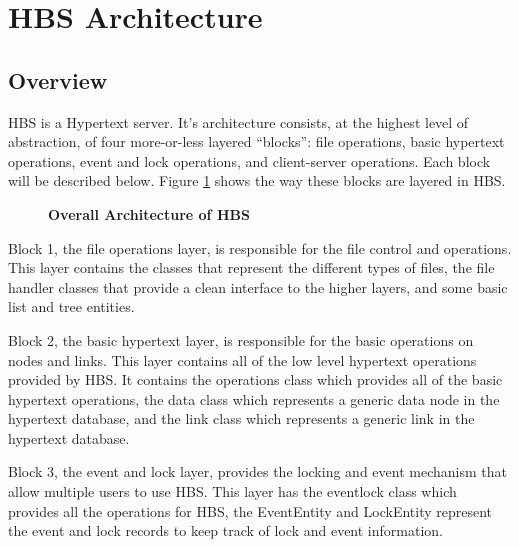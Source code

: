 
\section{HBS Architecture}
\label{sec:architecture}
\subsection{Overview}

HBS is a Hypertext server.  It's architecture consists, at the highest
level of abstraction, of four more-or-less
layered ``blocks'': file operations, basic hypertext operations, event
and lock operations, and client-server operations.  Each block will be
described below.  Figure \ref{fig:Overall} shows the way these blocks
are layered in HBS.

\begin{figure}[htb]
  \centerline{}
  \caption{{\bf Overall Architecture of HBS}}
  \label{fig:Overall}
\end{figure}

Block 1, the file operations layer, is responsible for the file control and
operations.  This layer contains the classes that represent the different
types of files, the file handler classes that provide a clean interface to
the higher layers, and some basic list and tree entities.

Block 2, the basic hypertext layer, is responsible for the basic operations
on nodes and links.  This layer contains all of the low level hypertext
operations provided by HBS.  It contains the operations class which
provides all of the basic hypertext operations, the data class which
represents a generic data node in the hypertext database, and the link
class which represents a generic link in the hypertext database.

Block 3, the event and lock layer, provides the locking and event mechanism
that allow multiple users to use HBS.  This layer has the eventlock
class which provides all the operations for HBS, the EventEntity and
LockEntity represent the event and lock records to keep track of lock and
event information.  

